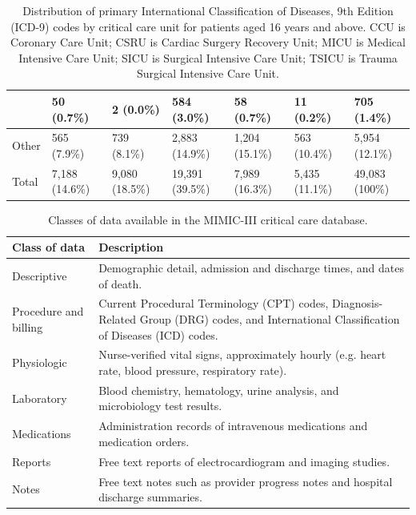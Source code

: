 \documentclass[english]{article}
\begin{document}
\begin{center}
\begin{table}
\begin{tabular}{|p{4.0cm}|p{1.25cm}|p{1.25cm}|p{1.25cm}|p{1.25cm}|p{1.25cm}|p{1.25cm}|}
    & 50 (0.7\%) & 2 (0.0\%) & 584 (3.0\%) & 58 (0.7\%) & 11 (0.2\%) & 705 (1.4\%) \\
    \hline
    Other & 565 (7.9\%) & 739 (8.1\%) & 2,883 (14.9\%) & 1,204 (15.1\%) & 563 (10.4\%) & 5,954 (12.1\%) \\
    \hline
    Total & 7,188 (14.6\%) & 9,080 (18.5\%) & 19,391 (39.5\%) & 7,989 (16.3\%) & 5,435 (11.1\%) & 49,083 (100\%) \\
    \hline
\end{tabular}
\caption{Distribution of primary International Classification of Diseases, 9th Edition (ICD-9) codes by critical care unit for patients aged 16 years and above. CCU is Coronary Care Unit; CSRU is Cardiac Surgery Recovery Unit; MICU is Medical Intensive Care Unit; SICU is Surgical Intensive Care Unit; TSICU is Trauma Surgical Intensive Care Unit.}
\label{table:icddistribution}
\end{table}
\end{center}


\begin{center}
\begin{table}
\begin{tabular}{|l|p{8cm}|}
    \hline
    Class of data & Description \\
    \hline
    Descriptive & Demographic detail, admission and discharge times, and dates of death. \\
    \hline
    Procedure and billing & Current Procedural Terminology (CPT) codes, Diagnosis-Related Group (DRG) codes, and International Classification of Diseases (ICD) codes. \\
    \hline
    Physiologic & Nurse-verified vital signs, approximately hourly (e.g. heart rate, blood pressure, respiratory rate). \\
    \hline
    Laboratory & Blood chemistry, hematology, urine analysis, and microbiology test results. \\
    \hline
    Medications & Administration records of intravenous medications and medication orders. \\
    \hline
    Reports & Free text reports of electrocardiogram and imaging studies. \\
    \hline
    Notes & Free text notes such as provider progress notes and hospital discharge summaries. \\
    \hline
\end{tabular}
\caption{Classes of data available in the MIMIC-III critical care database.}
\label{table:dataclasses}
\end{table}
\end{center}
\end{document}
